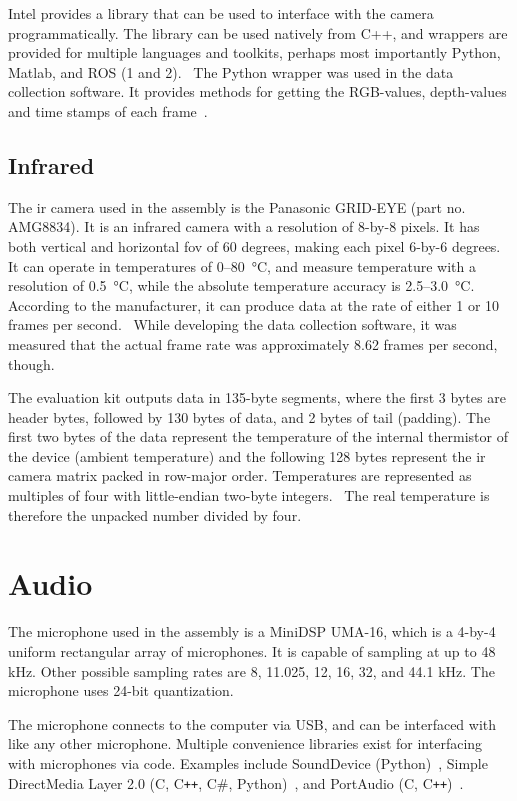 Intel provides a library that can be used to interface with the camera programmatically.
The library can be used natively from C++,
and wrappers are provided for multiple languages and toolkits,
perhaps most importantly Python, Matlab, and ROS (1 and 2).~\cite{librealsense2}
The Python wrapper was used in the data collection software.
It provides methods for getting the RGB-values, depth-values and time stamps of each frame~\cite{librealsense2-python-docs}.
 
\subsection{Infrared}
The \gls{ir} camera used in the assembly is the Panasonic GRID-EYE (part no. AMG8834).
It is an infrared camera with a resolution of 8-by-8 pixels.
It has both vertical and horizontal \gls{fov} of 60 degrees,
making each pixel 6-by-6 degrees.
It can operate in temperatures of 0--\SI{80}{\celsius},
and measure temperature with a resolution of \SI{0.5}{\celsius},
while the absolute temperature accuracy is 2.5--\SI{3.0}{\celsius}.
According to the manufacturer,
it can produce data at the rate of either 1 or 10 frames per second.~\cite{grid-eye-manual}
While developing the data collection software,
it was measured that the actual frame rate was approximately 8.62 frames per second, though.

The evaluation kit outputs data in 135-byte segments,
where the first 3 bytes are header bytes, followed by 130 bytes of data, and 2 bytes of tail (padding).
The first two bytes of the data represent the temperature 
of the internal thermistor of the device (ambient temperature)
and the following 128 bytes represent the \gls{ir} camera matrix packed in row-major order.
Temperatures are represented as multiples of four with little-endian two-byte integers.~\cite{grid-eye-protocol}
The real temperature is therefore the unpacked number divided by four.

\section{Audio}
\label{sec:2-mic}
The microphone used in the assembly is a MiniDSP UMA-16,
which is a 4-by-4 uniform rectangular array of microphones.
It is capable of sampling at up to 48 kHz.
Other possible sampling rates are 8, 11.025, 12, 16, 32, and 44.1 kHz.
The microphone uses 24-bit quantization.

The microphone connects to the computer via USB,
and can be interfaced with like any other microphone.
Multiple convenience libraries exist for interfacing with microphones via code.
Examples include SoundDevice (Python)~\cite{sounddevice-docs},
Simple DirectMedia Layer 2.0 (C, C\texttt{++}, C\#, Python)~\cite{SDL2}, and PortAudio (C, C\texttt{++})~\cite{portaudio}.

